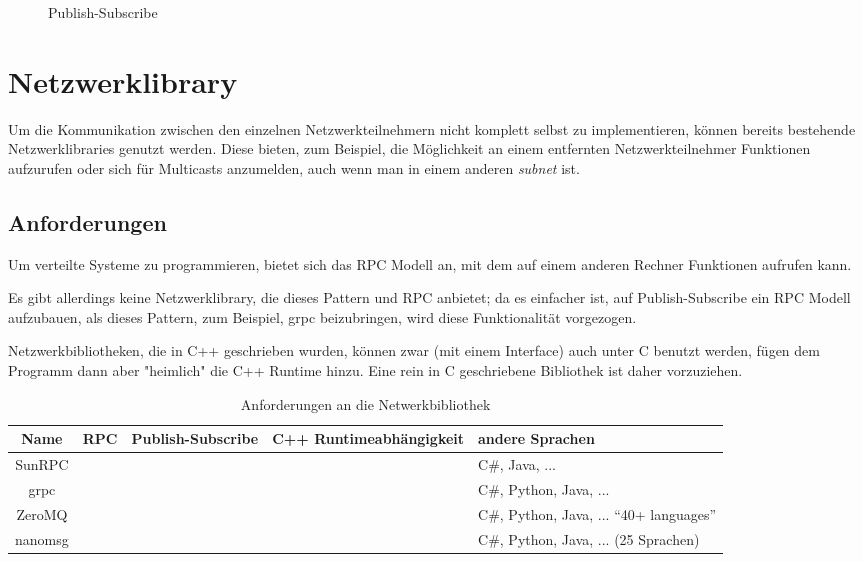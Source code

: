 \begin{figure}
	\centering
	\caption{Publish-Subscribe}
	\label{fig:pubsub}
\end{figure}


\clearpage
\section{Netzwerklibrary}
Um die Kommunikation zwischen den einzelnen Netzwerkteilnehmern nicht komplett selbst zu implementieren, k{\"{o}}nnen bereits bestehende Netzwerklibraries genutzt werden.
Diese bieten, zum Beispiel, die M{\"{o}}glichkeit an einem entfernten Netzwerkteilnehmer Funktionen aufzurufen oder sich f{\"{u}}r Multicasts anzumelden, auch wenn man in einem anderen
\textit{subnet} ist.

\subsection{Anforderungen}
Um verteilte Systeme zu programmieren, bietet sich das RPC Modell an, mit dem auf einem anderen Rechner Funktionen aufrufen kann.

Es gibt allerdings keine Netzwerklibrary, die dieses Pattern und RPC anbietet; da es einfacher ist, auf Publish-Subscribe ein RPC Modell aufzubauen, als dieses Pattern, zum Beispiel, grpc beizubringen, wird
diese Funktionalit{\"{a}}t vorgezogen.

Netzwerkbibliotheken, die in C++ geschrieben wurden, k{\"{o}}nnen zwar (mit einem Interface) auch unter C benutzt werden, f{\"{u}}gen dem Programm
dann aber "heimlich" die C++ Runtime hinzu. Eine rein in C geschriebene Bibliothek ist daher vorzuziehen.

\clearpage %
\begin{table}[h]
\centering
\begin{tabu}{c | c | c | c | p{5cm}}
	\toprule
	Name & RPC & Publish-Subscribe & C++ Runtimeabh{\"{a}}ngigkeit & andere Sprachen \\
	\midrule
	SunRPC & \checkmark & \xmark & \checkmark & C\#, Java, ... \\
	grpc\cite{grpc} & \checkmark & \xmark & \xmark & C\#, Python, Java, ... \\
	ZeroMQ\cite{zeromq} & \xmark & \checkmark & \xmark & C\#, Python, Java, ... \enquote{40+ languages} \\
	nanomsg\cite{nanomsg} & \xmark & \checkmark & \checkmark & C\#, Python, Java, ... (25 Sprachen) \\
	\bottomrule
\end{tabu}
\caption{Anforderungen an die Netwerkbibliothek}
\end{table}


